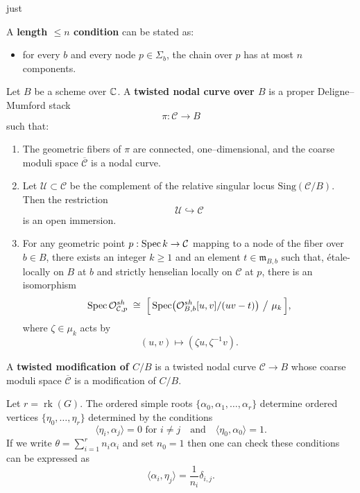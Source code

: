 just \documentclass[12pt]{article}
\begin{document}
A \textbf{length $\le n$ condition} can be stated as:
\begin{itemize}
\item for every $b$ and every node $p\in \Sigma_b$, the chain over $p$ has at most $n$ components.
\end{itemize}

\begin{definition}\label{def:twisted-curve}
Let $B$ be a scheme over $\mathbb{C}$.
A \textbf{twisted nodal curve over $B$} is a proper Deligne--Mumford stack
\[
\pi:\mathcal C \longrightarrow B
\]
such that:

\begin{enumerate}
\item
The geometric fibers of $\pi$ are connected, one--dimensional, and the
coarse moduli space $\overline{\mathcal C}$ is a nodal curve.

\item
Let $\mathcal U \subset \mathcal C$ be the complement of the relative
singular locus $\mathrm{Sing}(\mathcal C/B)$.  
Then the restriction
\[
\mathcal U \hookrightarrow \mathcal C
\]
is an open immersion.

\item
For any geometric point $p:\operatorname{Spec} k\to \mathcal C$ mapping to a node of the
fiber over $b\in B$, there exists an integer $k\ge1$ and an element
$t\in \mathfrak m_{B,b}$ such that, étale-locally on $B$ at $b$ and strictly
henselian locally on $\mathcal C$ at $p$, there is an isomorphism
\[
\Spec \mathcal O_{\mathcal C,p}^{sh}
\;\cong\;
\Bigl[\,\Spec\bigl(\mathcal O_{B,b}^{sh}[u,v]/(uv-t)\bigr)\ \big/\ \mu_k\,\Bigr],
\]
where $\zeta\in\mu_k$ acts by
\[
(u,v)\longmapsto(\zeta u,\zeta^{-1}v).
\]
\end{enumerate}
\end{definition}

\begin{definition}
    A \textbf{twisted modification of $C/B$} is a twisted nodal curve $\mathcal{C} \to B$ whose coarse moduli space $\overline{\mathcal{C}}$ is a modification of $C/B$.
\end{definition}

Let $r = \operatorname{rk}(G)$. The ordered simple roots $\{\alpha_0,\alpha_1,\dots,\alpha_r\}$ determine
ordered vertices $\{\eta_0,\dots,\eta_r\}$ determined by the conditions
\[
\langle \eta_i,\alpha_j\rangle = 0 \text{ for } i\neq j
\quad\text{and}\quad
\langle \eta_0,\alpha_0\rangle =1.
\]
If we write $\theta = \sum_{i=1}^r n_i\alpha_i$ and set $n_0=1$ then one can
check these conditions can be expressed as
\begin{equation}
\label{eq:alpha-eta}
\langle \alpha_i,\eta_j\rangle = \frac{1}{n_i}\delta_{i,j}.
\end{equation}
\end{document}
